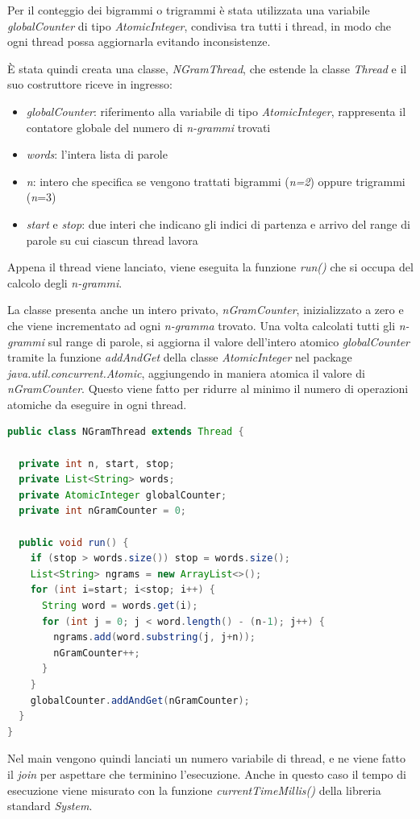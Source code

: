\documentclass[10pt,twocolumn,letterpaper]{article}
\begin{document}
Per il conteggio dei bigrammi o trigrammi è stata utilizzata una variabile  \textit{globalCounter} di tipo \textit{AtomicInteger}, condivisa tra tutti i thread, in modo che ogni thread possa aggiornarla evitando inconsistenze.

È stata quindi creata una classe, \textit{NGramThread}, che estende la classe \textit{Thread} e il suo costruttore riceve in ingresso:
\begin{itemize}
	\item \textit{globalCounter}: riferimento alla variabile di tipo \textit{AtomicInteger}, rappresenta il contatore globale del numero di \textit{n-grammi} trovati
	\item \textit{words}: l'intera lista di parole
	\item \textit{n}: intero che specifica se vengono trattati bigrammi (\textit{n=2}) oppure trigrammi (\textit{n}=3)
	\item \textit{start} e \textit{stop}: due interi che indicano gli indici di partenza e arrivo del range di parole su cui ciascun thread lavora
\end{itemize}

Appena il thread viene lanciato, viene eseguita la funzione \textit{run()} che si occupa del calcolo degli \textit{n-grammi}.

La classe presenta anche un intero privato, \textit{nGramCounter}, inizializzato a zero e che viene incrementato ad ogni \textit{n-gramma} trovato. Una volta calcolati tutti gli \textit{n-grammi} sul range di parole, si aggiorna il valore dell'intero atomico \textit{globalCounter} tramite la funzione \textit{addAndGet} della classe \textit{AtomicInteger} nel package \textit{java.util.concurrent.Atomic}, aggiungendo in maniera atomica il valore di \textit{nGramCounter}. Questo viene fatto per ridurre al minimo il numero di operazioni atomiche da eseguire in ogni thread.\newline

\begin{lstlisting}[basicstyle=\scriptsize, language=Java, frame=single, caption={Esempio di ricerca di bigrammi/trigrammi con Java Thread},captionpos=b]
public class NGramThread extends Thread {

  private int n, start, stop;
  private List<String> words;
  private AtomicInteger globalCounter;
  private int nGramCounter = 0;

  public void run() {
    if (stop > words.size()) stop = words.size();
    List<String> ngrams = new ArrayList<>();
    for (int i=start; i<stop; i++) {
      String word = words.get(i);
      for (int j = 0; j < word.length() - (n-1); j++) {
        ngrams.add(word.substring(j, j+n));
        nGramCounter++;
      }
    }
    globalCounter.addAndGet(nGramCounter);
  }
}
\end{lstlisting}
Nel main vengono quindi lanciati un numero variabile di thread, e ne viene fatto il \textit{join} per aspettare che terminino l'esecuzione. 
Anche in questo caso il tempo di esecuzione viene misurato con la funzione \textit{currentTimeMillis()} della libreria standard \textit{System}.\newline
\end{document}
